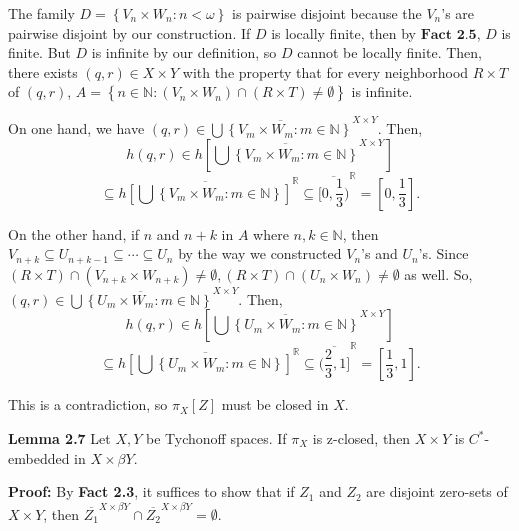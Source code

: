\documentclass{article}
\begin{document}
\vskip 20pt
The family $D=\left\{V_n\times W_n: n<\omega\right\}$ is pairwise disjoint because the $V_n$'s are pairwise disjoint by our construction. If $D$ is locally finite, then by $\textbf{Fact 2.5}$, $D$ is finite. But $D$ is infinite by our definition, so $D$ cannot be locally finite. Then, there exists $(q,r)\in X\times Y$ with the property that for every neighborhood $R\times T$ of $(q,r)$, $A=\left\{n\in \mathbb{N}: (V_n\times W_n)\cap (R\times T) \neq \emptyset\right\}$ is infinite. 
\vskip 20pt

On one hand, we have $(q,r)\in \overline{\bigcup\left\{V_m\times W_m: m\in \mathbb{N}\right\}}^{X\times Y}.$ Then, 
$$h(q,r)\in h\left[\overline{\bigcup\left\{V_m\times W_m: m\in \mathbb{N}\right\}}^{X\times Y}\right] $$
$$\subseteq \overline{h\left[\bigcup\left\{V_m\times W_m: m\in \mathbb{N}\right\}\right]}^{\mathbb{R}}\subseteq \overline{[0,\frac{1}{3})}^\mathbb{R}=[0,\frac{1}{3}].$$

\vskip 20pt

On the other hand, if $n$ and $n+k$ in $A$ where $n,k\in \mathbb{N}$, then $V_{n+k}\subseteq U_{n+k-1}\subseteq \cdots \subseteq U_n$ by the way we constructed $V_n$'s and $U_n$'s. Since $(R\times T)\cap (V_{n+k}\times W_{n+k})\neq \emptyset, (R\times T)\cap (U_n\times W_n) \neq \emptyset$ as well. 
\vskip 10pt
So, $(q,r)\in \overline{\bigcup\left\{U_m\times W_m: m\in \mathbb{N}\right\}}^{X\times Y}.$ Then, 
$$h(q,r)\in h\left[\overline{\bigcup\left\{U_m\times W_m: m\in \mathbb{N}\right\}}^{X\times Y}\right] $$
$$\subseteq \overline{h\left[\bigcup\left\{U_m\times W_m: m\in \mathbb{N}\right\}\right]}^{\mathbb{R}}\subseteq \overline{(\frac{2}{3},1]}^\mathbb{R}=[\frac{1}{3}, 1].$$


\vskip 15pt

This is a contradiction, so $\pi_X[Z]$ must be closed in $X$.




\vskip 40pt







\textbf{Lemma 2.7}  Let $X,Y$ be Tychonoff spaces. If $\pi_X$ is z-closed, then $X\times Y$ is $C^*$-embedded in $X\times \beta Y$.


\vskip 15pt


\textbf{Proof:} By \textbf{Fact 2.3}, it suffices to show that if $Z_1$ and $Z_2$ are disjoint zero-sets of $X\times Y$, then $\overline{Z_1}^{X\times \beta Y} \cap \overline{Z_2}^{X\times \beta Y}=\emptyset.$
\end{document}
